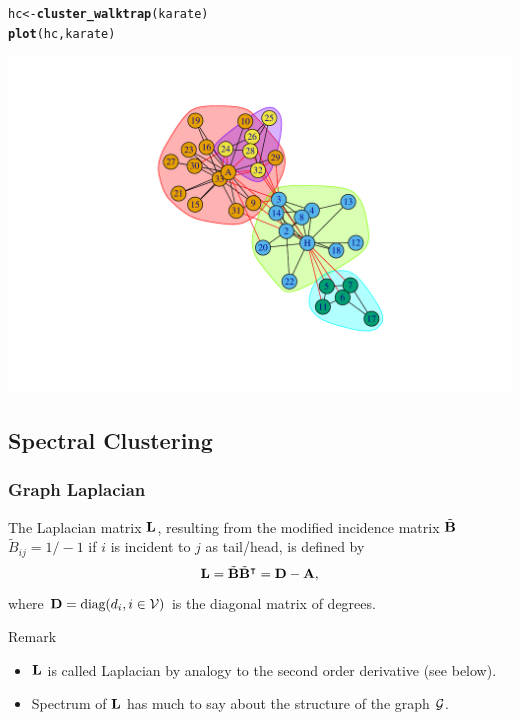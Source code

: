 \documentclass{beamer}\usepackage[]{graphicx}\usepackage[]{color}
\makeatletter
\newcommand{\hlstd}[1]{\textcolor[rgb]{0.345,0.345,0.345}{#1}}%
\newcommand{\hlkwb}[1]{\textcolor[rgb]{0.69,0.353,0.396}{#1}}%
\newcommand{\hlkwd}[1]{\textcolor[rgb]{0.737,0.353,0.396}{\textbf{#1}}}%
\newenvironment{kframe}{%
 \def\at@end@of@kframe{}%
 \ifinner\ifhmode%
  \def\at@end@of@kframe{\end{minipage}}%
  \begin{minipage}{\columnwidth}%
 \fi\fi%
 \def\FrameCommand##1{\hskip\@totalleftmargin \hskip-\fboxsep
 \colorbox{shadecolor}{##1}\hskip-\fboxsep
     \hskip-\linewidth \hskip-\@totalleftmargin \hskip\columnwidth}%
 \MakeFramed {\advance\hsize-\width
   \@totalleftmargin\z@ \linewidth\hsize
   \@setminipage}}%
 {\par\unskip\endMakeFramed%
 \at@end@of@kframe}
\newenvironment{knitrout}{}{} %
\makeatother
\begin{document}
\begin{frame}
\begin{knitrout}
\end{knitrout}

\begin{knitrout}\scriptsize
{}\color{fgcolor}\begin{kframe}
\begin{alltt}
\hlstd{hc} \hlkwb{<-} \hlkwd{cluster_walktrap}\hlstd{(karate)}
\hlkwd{plot}\hlstd{(hc,karate)}
\end{alltt}
\end{kframe}
\includegraphics[width=.8\textwidth]{figures/unnamed-chunk-5-1} 

\end{knitrout}

\end{frame}

\subsection{Spectral Clustering}

\begin{frame}
  \frametitle{Graph Laplacian}

  \begin{definition}
    The Laplacian matrix $\mathbf{L}$, resulting from the modified incidence matrix $\tilde{\mathbf{B}}$ $\tilde{\! B}_{ij}= 1/-1$ if $i$ is incident to $j$ as tail/head, is defined by 
    \[
      \mathbf{L} = \tilde {\mathbf{B}} \tilde {\mathbf{B}}^\intercal = \mathbf{D} - \mathbf{A},
    \]
    where $\mathbf{D} = \text{diag}(d_i, i\in\mathcal{V})$ is the diagonal matrix of degrees. 
  \end{definition}

  \begin{block}{Remark}
    \begin{itemize}
    \item $\mathbf{L}$ is called Laplacian by analogy to the second order derivative (see below).
    \item Spectrum of $\mathbf{L}$ has much to say about the structure of the graph $\mathcal{G}$.
    \end{itemize}
  \end{block}

\end{frame}
\end{document}
